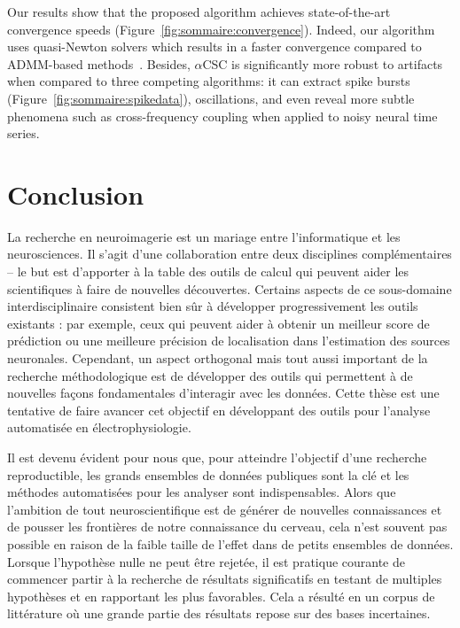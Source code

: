 Our results
show that the proposed algorithm achieves state-of-the-art convergence speeds (Figure~\ref{fig:sommaire:convergence}). Indeed, our algorithm uses quasi-Newton solvers which results in a faster convergence compared to ADMM-based methods~\citep{heide2015fast, wohlberg2016efficient}. Besides, $\alpha$CSC is
significantly more robust to artifacts when compared to three competing algorithms: it can extract
spike bursts (Figure~\ref{fig:sommaire:spikedata}), oscillations, and even reveal more subtle phenomena such as cross-frequency coupling
when applied to noisy neural time series.

\section*{Conclusion}

La recherche en neuroimagerie est un mariage entre l'informatique et les neurosciences. Il s'agit d'une collaboration entre deux disciplines complémentaires -- le but est d'apporter à la table des outils de calcul qui peuvent aider les scientifiques à faire de nouvelles découvertes. Certains aspects de ce sous-domaine interdisciplinaire consistent bien sûr à développer progressivement les outils existants : par exemple, ceux qui peuvent aider à obtenir un meilleur score de prédiction ou une meilleure précision de localisation dans l'estimation des sources neuronales. Cependant, un aspect orthogonal mais tout aussi important de la recherche méthodologique est de développer des outils qui permettent à de nouvelles façons fondamentales d'interagir avec les données. Cette thèse est une tentative de faire avancer cet objectif en développant des outils pour l'analyse automatisée en électrophysiologie.

Il est devenu évident pour nous que, pour atteindre l'objectif d'une recherche reproductible, les grands ensembles de données publiques sont la clé et les méthodes automatisées pour les analyser sont indispensables. Alors que l'ambition de tout neuroscientifique est de générer de nouvelles connaissances et de pousser les frontières de notre connaissance du cerveau, cela n'est souvent pas possible en raison de la faible taille de l'effet dans de petits ensembles de données. Lorsque l'hypothèse nulle ne peut être rejetée, il est pratique courante de commencer partir à la recherche  de résultats significatifs en testant de multiples hypothèses et en rapportant les plus favorables. Cela a résulté en un corpus de littérature où une grande partie des résultats repose sur des bases incertaines.
 

